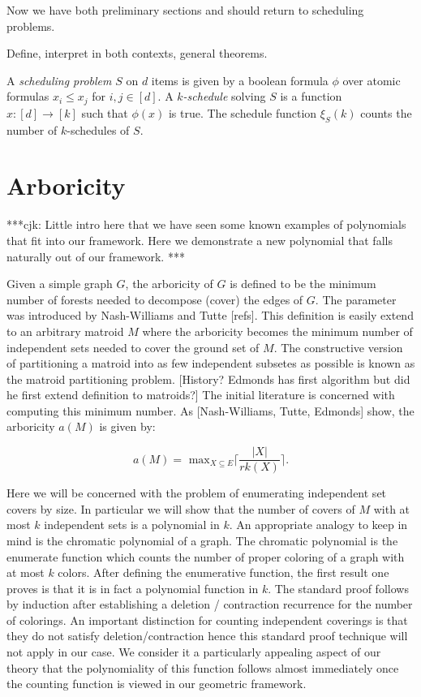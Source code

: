 \documentclass[11pt,letter]{amsart}
\newcommand{\defn}[1]{\emph{#1}}
\begin{document}
Now we have both preliminary sections and should return to scheduling problems.

Define, interpret in both contexts, general theorems.  



A \defn{scheduling problem} $S$ on $d$ items is given by a boolean
formula $\phi$ over atomic formulas $x_i\leq x_j$ for $i,j\in[d]$. A
\defn{$k$-schedule} solving $S$ is a function $x:[d]\rightarrow[k]$
such that $\phi(x)$ is true. The schedule function $\xi_S(k)$ counts
the number of $k$-schedules of $S$.




\section{Arboricity}

***cjk: Little intro here that we have seen some known examples of
polynomials that fit into our framework.  Here we demonstrate a new polynomial 
that falls naturally out of our framework. ***


Given a simple graph $G$, the arboricity of $G$ is defined to be the
minimum number of forests needed to decompose (cover) the edges of
$G$.  The parameter was introduced by Nash-Williams and Tutte [refs].
This definition is easily extend to an arbitrary matroid $M$ where the
arboricity becomes the minimum number of independent sets needed to
cover the ground set of $M$.  The constructive version of partitioning
a matroid into as few independent subsetes as possible is known as the
matroid partitioning problem. [History?  Edmonds has first algorithm
  but did he first extend definition to matroids?]  The initial
literature is concerned with computing this minimum number.  As
[Nash-Williams, Tutte, Edmonds] show, the arboricity $a(M)$ is given
by:

$$ a(M) = \textrm{ max}_{X\subseteq E} \lceil { \frac{|X|}{rk(X)}} \rceil . $$

Here we will be concerned with the problem of enumerating independent
set covers by size.  In particular we will show that the number of
covers of $M$ with at most $k$ independent sets is a polynomial in
$k$.  An appropriate analogy to keep in mind is the chromatic
polynomial of a graph.  The chromatic polynomial is the enumerate
function which counts the number of proper coloring of a graph with at
most $k$ colors.  After defining the enumerative function, the first
result one proves is that it is in fact a polynomial function in $k$.
The standard proof follows by induction after establishing a deletion
/ contraction recurrence for the number of colorings.  An important
distinction for counting independent coverings is that they do not
satisfy deletion/contraction hence this standard proof technique will
not apply in our case.  We consider it a particularly appealing aspect
of our theory that the polynomiality of this function follows almost
immediately once the counting function is viewed in our geometric
framework.
\end{document}
